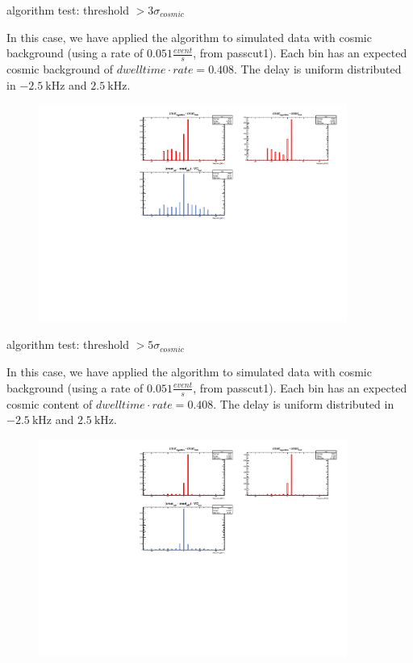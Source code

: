 \documentclass[9pt]{beamer}
\begin{document}
\begin{frame}{algorithm test: threshold $ > 3 \sigma_{cosmic}$}

In this case, we have applied the algorithm to simulated data with cosmic background (using a rate of $0.051 \frac{event}{s}$, from passcut1). Each bin has an expected cosmic background of $dwelltime \cdot rate = 0.408$.
The delay is uniform distributed in $\SI{-2.5}{\kilo \hertz}$ and $\SI{+2.5}{\kilo \hertz}$. 
\begin{figure}
\includegraphics[width = 0.9\textwidth]{../Plot/OnsetResult11.pdf}
\end{figure}
\end{frame}

\begin{frame}{algorithm test: threshold $ > 5 \sigma_{cosmic}$}

In this case, we have applied the algorithm to simulated data with cosmic background (using a rate of $0.051 \frac{event}{s}$, from passcut1). Each bin has an expected cosmic content of $dwelltime \cdot rate = 0.408$.
The delay is uniform distributed in $\SI{-2.5}{\kilo \hertz}$ and $\SI{+2.5}{\kilo \hertz}$. 
\begin{figure}
\includegraphics[width = 0.9\textwidth]{../Plot/OnsetResult12.pdf}
\end{figure}

\end{frame}
\end{document}

